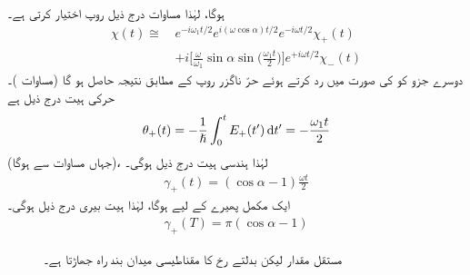 ہوگا، لہٰذا مساوات  درج ذیل روپ اختیار کرتی ہے۔ 
\begin{align}
\chi (t) \cong \,&e^{- i \omega_1 t/2} e^{i (\omega \cos \alpha) t/2} e^{- i \omega t/2} \chi_+(t) \nonumber\\
&+i \big [ \frac{\omega}{\omega_1} \sin \alpha \sin \big ( \frac{\omega_1 t}{2} \big ) \big ]e^{+ i \omega t/2} \chi_{-} (t)
\end{align}
دوسرے جزو کو  کی صورت میں رد کرتے ہوئے حرّ ناگزر روپ کے مطابق نتیجہ حاصل ہو گا (مساوات )۔ حرکی ہیت درج ذیل ہے 
\begin{align}
\theta_+ (t) = - \frac{1}{\hslash} \int_0^t E_+ (t') \dif t' = - \frac{\omega_1 t}{2}
\end{align}
(جہاں مساوات  سے  ہوگا)، لہٰذا ہندسی ہیت درج ذیل ہوگی۔
\begin{align}
\gamma_+ (t) = (\cos \alpha - 1) \frac{\omega t}{2}
\end{align}
ایک مکمل پھیرے کے لیے  ہوگا، لہٰذا ہیت بیری درج ذیل ہوگی۔
\begin{align}\label{مساوات_حر_گاما}
\gamma_+ (T) = \pi (\cos \alpha - 1)
\end{align}

\begin{figure}
\centering
{}
\caption{مستقل مقدار لیکن بدلتے رخ کا مقناطیسی میدان بند راہ جھاڑتا ہے۔}
\label{شکل_حرارت_نا_گزر_مقناطیسی_میدان_بند_راہ}
\end{figure}

